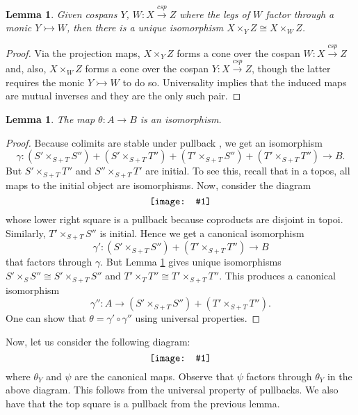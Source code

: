 \documentclass[11pt]{amsart}
\newcommand{\from}{\colon}
\newcommand{\cospan}{\xrightarrow{\mathit{csp}}}
\newcommand{\diagram}[1]{\raisebox{-0.5\height}{\texttt{[image: \#1]}}}
\newtheorem{lem}[thm]{Lemma}
\theoremstyle{remark}
\theoremstyle{definition}
\begin{document}
\begin{lem}
	\label{lem:pullback over subobject}
	Given cospans $Y$, $W \from X \cospan Z$ where the legs of $W$ factor through a monic $Y \rightarrowtail W$, then there is a unique isomorphism $X \times_Y Z \cong X \times_W Z$. 
\end{lem}
\begin{proof}
	Via the projection maps, $X \times_Y Z$ forms a cone over the cospan $W \from X \cospan Z$ and, also, $X \times_W Z$ forms a cone over the cospan $Y \from X \cospan Z$, though the latter requires the monic $Y \rightarrowtail W$ to do so. Universality implies that the induced maps are mutual inverses and they are the only such pair.  
\end{proof}
%
%
%
%
%
%

\begin{lem}
\label{lem.Theta Iso}
	The map $\theta \from A \to B$ is an isomorphism.
\end{lem}
%
%
\begin{proof}
	Because colimits are stable under pullback \cite[Thm.~4.7.2]{MacLaneMoerdijk_SheavesGeomLogic}, we get an isomorphism
	\[
	\gamma \from (S'\times_{S+T}S'') +(S'\times_{S+T}T'') +(T'\times_{S+T}S'') +(T'\times_{S+T}T'') \to B.
	\]
	But $S'\times_{S+T}T''$ and $S''\times_{S+T}T'$ are initial. To see this, recall that in a topos, all maps to the initial object are isomorphisms. Now, consider the diagram
	\[
		\label{NoRef_ShowingInitialObject}
		\diagram{NoRef_ShowingInitialObject}
	\]
	whose lower right square is a pullback because coproducts are disjoint in topoi.  Similarly, $T'\times_{S+T}S''$ is initial.  Hence we get a canonical isomorphism
	\begin{equation} \label{eq:B second iso}
	\gamma' \from (S'\times_{S+T}S'')+(T'\times_{S+T}T'') \to B
	\end{equation}
	that factors through $\gamma$. But Lemma \ref{lem:pullback over subobject} 
	gives unique isomorphisms $S' \times_{S} S'' \cong S' \times_{S+T} S''$ and $T'\times_{T} T'' \cong T' \times_{S+T} T''$. This produces a canonical isomorphism 
	\[
	\gamma'' \from A \to (S'\times_{S+T}S'')+(T'\times_{S+T}T'').
	\]
	One can show that $\theta = \gamma' \circ \gamma''$ using universal properties.  
\end{proof}
%
%
%
%
%
%
Now, let us consider the following diagram:
%
\begin{equation}
	\label{diag.the big cube}
	\diagram{Diag_BigCube}
\end{equation}
%
where $\theta_Y$ and $\psi$ are the canonical maps. Observe that $\psi$ factors through $\theta_Y$ in the above diagram.  This follows from the universal property of pullbacks. We also have that the top square is a pullback from the previous lemma.
%
%
%
%
%
%
\end{document}
